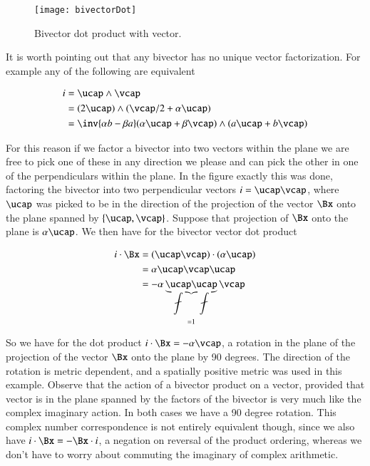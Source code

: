\begin{figure}[htp]
\centering
\texttt{[image: bivectorDot]}
\caption{Bivector dot product with vector.}\label{fig:rotationGen:bivectorDot}
\end{figure}

It is worth pointing out that any bivector has no unique vector factorization.  For example any of the following are equivalent

\begin{align*}
i 
&= \ucap \wedge \vcap \\
&= (2 \ucap) \wedge (\vcap/2 + \alpha \ucap) \\
&= \inv{\alpha b - \beta a} (\alpha \ucap + \beta \vcap ) \wedge (a \ucap + b \vcap)
\end{align*}

For this reason if we factor a bivector into two vectors within the plane we are free to pick one of these in any direction we please and can pick the other in one of the perpendiculars within the plane.  In the figure exactly this was done, factoring the bivector into two perpendicular vectors $i = \ucap \vcap$, where $\ucap$ was picked to be in the direction of the projection of the vector $\Bx$ onto the plane spanned by $\{\ucap, \vcap\}$.  Suppose that projection of $\Bx$ onto the plane is $\alpha \ucap$.  We then have for the bivector vector dot product

\begin{align*}
i \cdot \Bx 
&=
(\ucap\vcap) \cdot (\alpha \ucap) \\
&=
\alpha \ucap\vcap \ucap \\
&=
-\alpha \underbrace{\ucap\ucap}_{=1} \vcap \\
\end{align*}

So we have for the dot product $i \cdot \Bx = - \alpha \vcap$, a rotation in the plane of the projection of the vector $\Bx$ onto the plane by 90 degrees.  The direction of the rotation is metric dependent, and a spatially positive metric was used in this example.  Observe that the action of a bivector product on a vector, provided that vector is in the plane spanned by the factors of the bivector is very much like the complex imaginary action.  In both cases we have a 90 degree rotation.  This complex number correspondence is not entirely equivalent though, since we also have $i \cdot \Bx = -\Bx \cdot i$, a negation on reversal of the product ordering, whereas we don't have to worry about commuting the imaginary of complex arithmetic.

